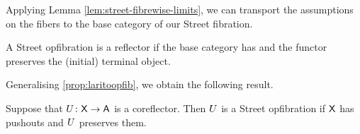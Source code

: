 \documentclass{amsart}
\begin{document}
Applying Lemma \ref{lem:street-fibrewise-limits}, we can
transport the assumptions on the fibers to the base category
of our Street fibration.

\begin{cor}
  A Street opfibration is a reflector if the base
  category has and the functor preserves the (initial)
  terminal object.
\end{cor}

Generalising \cref{prop:laritoopfib}, we obtain the following result.

\begin{prop}
  \label{thm:corefl-to-street-opfib}
  Suppose that $ U \colon \mathsf{X} \to \mathsf{A} $ is a
  coreflector. Then $ U $ is a Street opfibration
  if $ \mathsf{X} $ has pushouts and $ U $ preserves them.
\end{prop}
\end{document}
